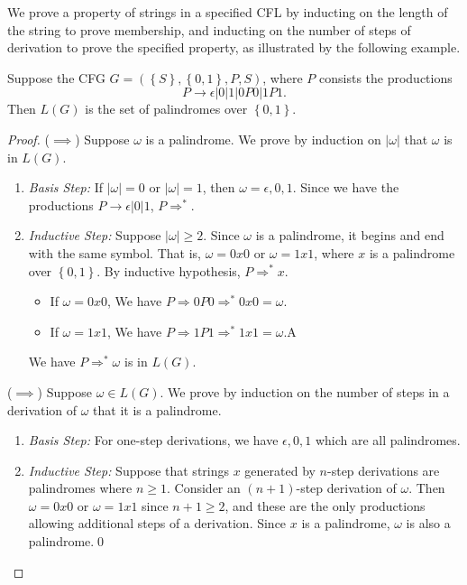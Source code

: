 We prove a property of strings in a specified CFL by inducting on the length of
the string to prove membership, and inducting on the number of steps of
derivation to prove the specified property, as illustrated by the following
example.
\begin{example}
  Suppose the CFG $G=\left( \left\{ S \right\}, \left\{ 0,1 \right\},P, S  \right) $, where
$P$ consists the productions \[P\to \epsilon|0|1|0P0|1P1.\] Then $L(G)$ is the
  set of palindromes over $\left\{ 0,1 \right\} $.\\
  \begin{proof}
    ($\implies $) Suppose $\omega$ is a palindrome. We prove by induction on
    $\left| \omega \right| $ that $\omega$ is in $L(G)$.
    \begin{enumerate}
      \item \textit{Basis Step:} If $\left| \omega \right| =0$ or $\left|
        \omega \right| =1$, then $\omega=\epsilon,0,1$. Since we have the
        productions $P\to\epsilon|0|1$, $P \Rightarrow ^{*}$.
      \item \textit{Inductive Step:} Suppose $\left| \omega \right| \ge 2$.
        Since $\omega$ is a palindrome, it begins and end with the same symbol.
        That is, $\omega=0x0$ or $\omega=1x1$, where $x$ is a palindrome over
        $\left\{ 0,1 \right\} $. By inductive hypothesis, $P \Rightarrow ^{*}x$.
        \begin{itemize}
          \item If $\omega=0x 0$, We have $P \Rightarrow 0P0 \Rightarrow ^{*} 0x0=\omega$.
          \item If $\omega=1x1$, We have $P \Rightarrow 1P1 \Rightarrow ^{*} 1x1=\omega$.A
        \end{itemize}
        We have $P \Rightarrow ^{*}\omega$ is in $L(G)$.
    \end{enumerate}
    ($\implies$) Suppose $\omega\in L(G)$. We prove by induction on the number
    of steps in a derivation of $\omega$ that it is a palindrome.
    \begin{enumerate}
      \item \textit{Basis Step:} For one-step derivations, we have $\epsilon,0,1$ which are
        all palindromes.
      \item \textit{Inductive Step:} Suppose that strings $x$ generated by
        $n$-step derivations are palindromes where $n\ge 1$. Consider an
        $(n+1)$-step derivation of $\omega$. Then $\omega=0x0$ or $\omega=1x1$
        since $n+1\ge 2$, and these are the only productions allowing
        additional steps of a derivation. Since $x$ is a palindrome, $\omega$
        is also a palindrome.\qed%
    \end{enumerate}
  \end{proof}
\end{example}
\vspace{-8mm}
